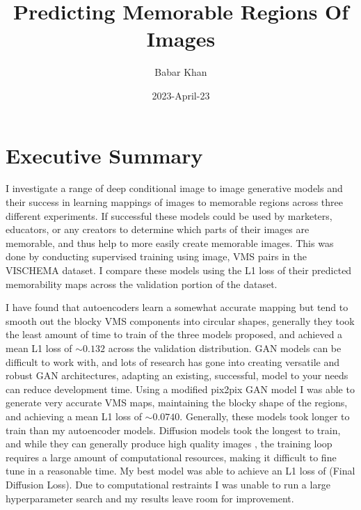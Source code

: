 \documentclass{UoYCSproject}
\author{Babar Khan}
\title{Predicting Memorable Regions Of Images}
\date{2023-April-23}
\begin{document}
\maketitle

\tableofcontents

\chapter{Executive Summary}

I investigate a range of deep conditional image to image generative models and their success in learning mappings of images to memorable regions across three different experiments. If successful these models could be used by marketers, educators, or any creators to determine which parts of their images are memorable, and thus help to more easily create memorable images.
This was done by conducting supervised training using image, VMS pairs in the VISCHEMA dataset. I compare these models using the L1 loss of their predicted memorability maps across the validation portion of the dataset.

I have found that autoencoders learn a somewhat accurate mapping but tend to smooth out the blocky VMS components into circular shapes, generally they took the least amount of time to train of the three models proposed, and achieved a mean L1 loss of \(\sim 0.132\) across the validation distribution. 
GAN models can be difficult to work with, and lots of research has gone into creating versatile and robust GAN architectures, adapting an existing, successful, model to your needs can reduce development time. Using a modified pix2pix GAN model \cite{isola2018imagetoimage} I was able to generate very accurate VMS maps, maintaining the blocky shape of the regions, and achieving a mean L1 loss of \(\sim 0.0740\). Generally, these models took longer to train than my autoencoder models.
Diffusion models took the longest to train, and while they can generally produce high quality images \cite{ramesh2022hierarchical, saharia2022photorealistic}, the training loop requires a large amount of computational resources, making it difficult to fine tune in a reasonable time. My best model was able to achieve an L1 loss of (Final Diffusion Loss). Due to computational restraints I was unable to run a large hyperparameter search and my results leave room for improvement.
\end{document}
